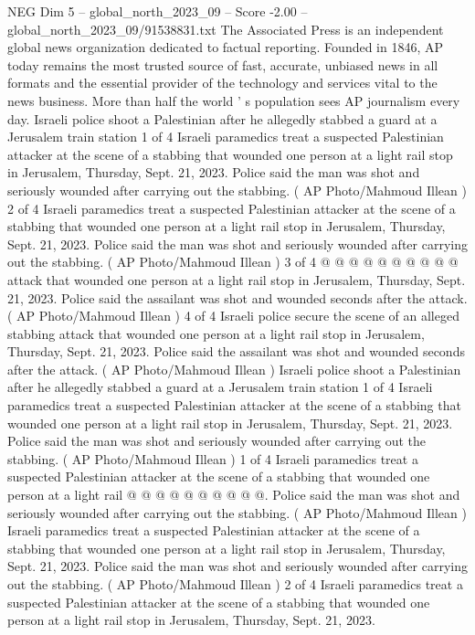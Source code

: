 \begin{textsample}{NEG Dim 5 – global\_north\_2023\_09 – Score -2.00 – global\_north\_2023\_09/91538831.txt}  \label{ex:f5_neg_006}
The Associated Press is an independent global news organization dedicated to factual reporting.
Founded in 1846, AP today remains the most trusted source of fast, accurate, unbiased news in all formats and the essential provider of the technology and services vital to the news business.
More than half the world ' s population sees AP journalism every day.
Israeli police shoot a Palestinian after he allegedly stabbed a guard at a Jerusalem train station 1 of 4 Israeli paramedics treat a suspected Palestinian attacker at the scene of a stabbing that wounded one person at a light rail stop in Jerusalem, Thursday, Sept. 21, 2023.
Police said the man was shot and seriously wounded after carrying out the stabbing. ( AP Photo/Mahmoud Illean ) 2 of 4 Israeli paramedics treat a suspected Palestinian attacker at the scene of a stabbing that wounded one person at a light rail stop in Jerusalem, Thursday, Sept. 21, 2023.
Police said the man was shot and seriously wounded after carrying out the stabbing. ( AP Photo/Mahmoud Illean ) 3 of 4 @ @ @ @ @ @ @ @ @ @ attack that wounded one person at a light rail stop in Jerusalem, Thursday, Sept. 21, 2023.
Police said the assailant was shot and wounded seconds after the attack. ( AP Photo/Mahmoud Illean ) 4 of 4 Israeli police secure the scene of an alleged stabbing attack that wounded one person at a light rail stop in Jerusalem, Thursday, Sept. 21, 2023.
Police said the assailant was shot and wounded seconds after the attack. ( AP Photo/Mahmoud Illean ) Israeli police shoot a Palestinian after he allegedly stabbed a guard at a Jerusalem train station 1 of 4 Israeli paramedics treat a suspected Palestinian attacker at the scene of a stabbing that wounded one person at a light rail stop in Jerusalem, Thursday, Sept. 21, 2023.
Police said the man was shot and seriously wounded after carrying out the stabbing. ( AP Photo/Mahmoud Illean ) 1 of 4 Israeli paramedics treat a suspected Palestinian attacker at the scene of a stabbing that wounded one person at a light rail @ @ @ @ @ @ @ @ @ @.
Police said the man was shot and seriously wounded after carrying out the stabbing. ( AP Photo/Mahmoud Illean ) Israeli paramedics treat a suspected Palestinian attacker at the scene of a stabbing that wounded one person at a light rail stop in Jerusalem, Thursday, Sept. 21, 2023.
Police said the man was shot and seriously wounded after carrying out the stabbing. ( AP Photo/Mahmoud Illean ) 2 of 4 Israeli paramedics treat a suspected Palestinian attacker at the scene of a stabbing that wounded one person at a light rail stop in Jerusalem, Thursday, Sept. 21, 2023.

\end{textsample}
